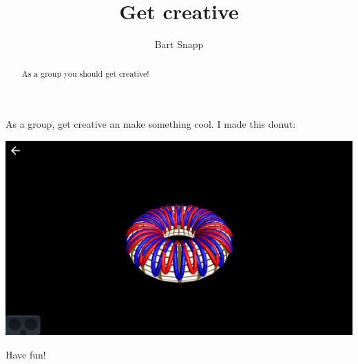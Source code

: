 \documentclass{ximera}
\author{Bart Snapp}
\title{Get creative}
\begin{document}
\begin{abstract}
  As a group you should get creative!
\end{abstract}
\maketitle

As a group, get creative an make something cool. I made this donut:
\begin{image}
  \includegraphics{getCreative.png}
\end{image}

Have fun!
\end{document}

